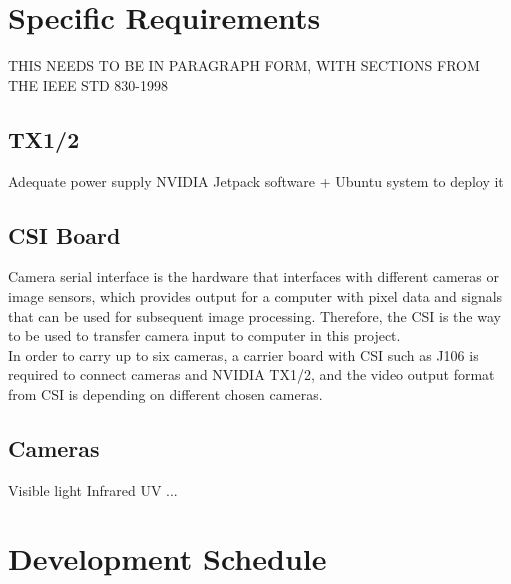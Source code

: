 \documentclass[letterpaper,10pt,serif,draftclsnofoot,onecolumn,compsoc,titlepage]{IEEEtran}
\begin{document}
\section{Specific Requirements}
THIS NEEDS TO BE IN PARAGRAPH FORM, WITH SECTIONS FROM THE IEEE STD 830-1998\\

\subsection{TX1/2}
		\subitem Adequate power supply
		\subitem NVIDIA Jetpack software + Ubuntu system to deploy it\\
\subsection{CSI Board}
		Camera serial interface is the hardware that interfaces with different cameras 
		or image sensors, which provides output for a computer with pixel data and 
		signals that can be used for subsequent image processing. Therefore, the CSI 
		is the way to be used to transfer camera input to computer in this project.\\
		In order to carry up to six cameras, a carrier board with CSI such as J106 is 
		required to connect cameras and NVIDIA TX1/2, and the video output format from 
		CSI is depending on different chosen cameras.\\

\subsection{Cameras}
		\subitem Visible light
		\subitem Infrared
		\subitem UV
		\subitem ...\\

\newpage
	\section{Development Schedule}
\end{document}
